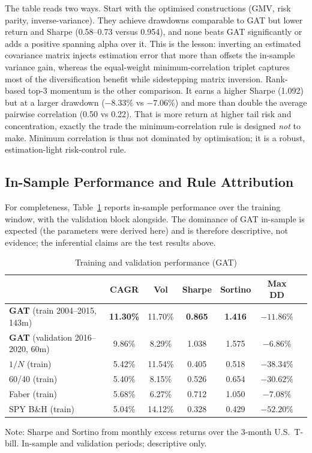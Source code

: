 The table reads two ways. Start with the optimised constructions (GMV, risk parity,
inverse-variance). They achieve drawdowns comparable to GAT but lower return and
Sharpe (0.58--0.73 versus 0.954), and none beats GAT significantly or adds a
positive spanning alpha over it. This is the \citet{demiguel2009} lesson:
inverting an estimated covariance matrix injects estimation error that more than
offsets the in-sample variance gain, whereas the equal-weight minimum-correlation
triplet captures most of the diversification benefit while sidestepping matrix
inversion. Rank-based top-3 momentum is the other comparison. It earns a higher
Sharpe (1.092) but at a larger drawdown ($-8.33\%$ vs $-7.06\%$) and more than double
the average pairwise correlation (0.50 vs 0.22). That is more return at higher tail
risk and concentration, exactly the trade the minimum-correlation rule is designed
\emph{not} to make. Minimum correlation is thus not dominated by optimisation; it is
a robust, estimation-light risk-control rule.

\subsection{In-Sample Performance and Rule Attribution}
\label{sec:res_insample}

For completeness, Table~\ref{tab:train} reports in-sample performance over the
training window, with the validation block alongside. The dominance of GAT
in-sample is expected (the parameters were derived here) and is therefore
descriptive, not evidence; the inferential claims are the test results above.

\begin{table}[H]
\centering
\caption{Training and validation performance (GAT)}
\label{tab:train}
\small
\begin{tabular}{lcccccc}
\toprule
& CAGR & Vol & Sharpe & Sortino & Max DD \\
\midrule
\textbf{GAT} (train 2004--2015, 143m) & \textbf{11.30\%} & 11.70\% & \textbf{0.865} & \textbf{1.416} & \textbf{$-11.86\%$} \\
\textbf{GAT} (validation 2016--2020, 60m) & 9.86\% & 8.29\% & 1.038 & 1.575 & $-6.86\%$ \\
\midrule
$1/N$ (train)         & 5.42\%  & 11.54\% & 0.405 & 0.518 & $-38.34\%$ \\
60/40 (train)         & 5.40\%  & 8.15\%  & 0.526 & 0.654 & $-30.62\%$ \\
Faber (train)         & 5.68\%  & 6.27\%  & 0.712 & 1.050 & $-7.08\%$ \\
SPY B\&H (train)      & 5.04\%  & 14.12\% & 0.328 & 0.429 & $-52.20\%$ \\
\bottomrule
\end{tabular}
\begin{flushleft}
\footnotesize Note: Sharpe and Sortino from monthly excess returns over the 3-month
U.S.\ T-bill. In-sample and validation periods; descriptive only.
\end{flushleft}
\end{table}

